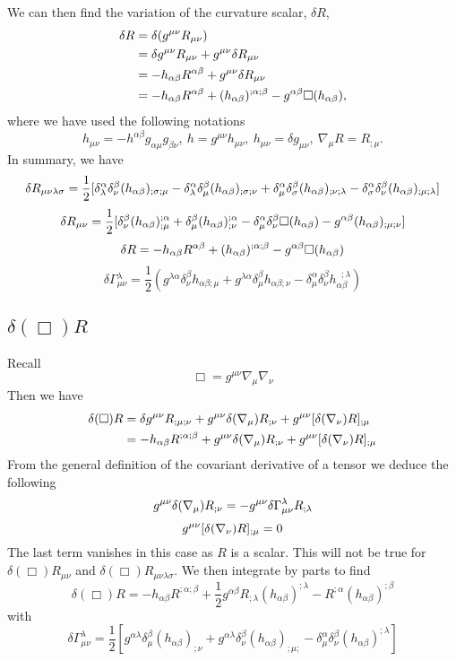 We can then find the variation of the curvature scalar, $\delta R$,
\begin{align}
\delta R&=\delta(g^{\mu\nu}R_{\mu\nu})
\nonumber\\&=\delta g^{\mu\nu}R_{\mu\nu}+g^{\mu\nu}\delta R_{\mu\nu}
\nonumber\\&=-h_{\alpha\beta}R^{\alpha\beta}+g^{\mu\nu}\delta R_{\mu\nu}
\nonumber\\&
=-h_{\alpha\beta}R^{\alpha\beta}+(h_{\alpha\beta})^{;\alpha;\beta}-g^{
\alpha\beta}\square(h_{\alpha\beta})
,\end{align}
where we have used the following notations
\[
h_{\mu\nu}=-h^{\alpha\beta}g_{\alpha\mu}g_{\beta\nu}
,~h=g^{\mu\nu}h_{\mu\nu}
,~h_{\mu\nu}=\delta g_{\mu\nu}
,~\nabla_{\mu}R=R_{;\mu}
.\]
In summary, we have
\[
\delta
R_{\mu\nu\lambda\sigma}=\frac{1}{2}[\delta_{\lambda}^{\alpha}\delta_{\nu}^{\beta
}(h_{\alpha\beta})_{;\sigma;\mu}-\delta_{\lambda}^{\alpha}\delta_{\mu}^{\beta}
(h_{\alpha\beta})_{;\sigma;\nu}+\delta_{\mu}^{\alpha}\delta_{\sigma}^{\beta}(h_{
\alpha\beta})_{;\nu;\lambda}-\delta_{\sigma}^{\alpha}\delta_{\nu}^{\beta}(h_{
\alpha\beta})_{;\mu;\lambda}]
\nonumber\]
\[
\delta
R_{\mu\nu}=\frac{1}{2}[\delta_{\nu}^{\beta}(h_{\alpha\beta})_{;\mu}^{;\alpha}
+\delta_{\mu}^{\beta}(h_{\alpha\beta})_{;\nu}^{;\alpha}-\delta_{\mu}^{\alpha}
\delta_{\nu}^{\beta}\square(h_{\alpha\beta})-g^{\alpha\beta}(h_{\alpha\beta})_{
;\mu;\nu}]
\nonumber\]
\[
\delta
R=-h_{\alpha\beta}R^{\alpha\beta}+(h_{\alpha\beta})^{;\alpha;\beta}-g^{
\alpha\beta}\square(h_{\alpha\beta})
\nonumber\]
\[
\delta\Gamma{}_{\mu\nu}^{\lambda}=\frac{1}{2}(g^{\lambda\alpha}\delta_{\nu}^{
\beta}h_{\alpha\beta;\mu}+g^{\lambda\alpha}\delta_{\mu}^{\beta}h_{
\alpha\beta;\nu}-\delta_{\mu}^{\alpha}\delta_{\nu}^{\beta}h_{\alpha\beta}^{
\;\;;\lambda})
 \]
\subsection{$\delta(\Box)R$}
Recall
\[
\Box=g^{\mu\nu}\nabla_{\mu}\nabla_{\nu}
\]
Then we have
\begin{align}
\nonumber\delta(\Box)R&=\delta
g^{\mu\nu}R_{;\mu;\nu}+g^{\mu\nu}\delta(\nabla_{\mu})R_{;\nu}+g^{\mu\nu}[
\delta(\nabla_{\nu})R]_{;\mu}
\\&
=-h_{\alpha\beta}R^{;\alpha;\beta}+g^{\mu\nu}\delta(\nabla_{\mu})R_{;\nu}+g^{
\mu\nu}[\delta(\nabla_{\nu})R]_{;\mu}
\end{align}
From the general definition of the covariant derivative of a tensor we deduce
the following
\[
 g^{\mu\nu}\delta(\nabla_{\mu})R_{;\nu}=-g^{\mu\nu}\delta\Gamma_{\mu\nu}^{\lambda
}R_{;\lambda}
\]
\[
 g^{\mu\nu}[\delta(\nabla_{\nu})R]_{;\mu}=0
\]
The last term vanishes in this case as $R$ is a scalar. This will not be true
for $\delta(\Box)R_{\mu\nu}$ and $\delta(\Box)R_{\mu\nu\lambda\sigma}$. We then
integrate by parts to find
\[
\delta(\Box)R=-h_{\alpha\beta}R^{;\alpha;\beta}+\frac{1}{2}g^{\alpha\beta}R_{
;\lambda}(h_{\alpha\beta})^{;\lambda}-R^{;\alpha}(h_{\alpha\beta})^{;\beta}
\]
with
\[
\delta\Gamma_{\mu\nu}^{\lambda}=\frac{1}{2}[g^{\alpha\lambda}\delta_{\mu}^{\beta
}(h_{\alpha\beta})_{;\nu}+g^{\alpha\lambda}\delta_{\nu}^{\beta}(h_{\alpha\beta}
)_{;\mu;}-\delta_{\mu}^{\alpha}\delta_{\nu}^{\beta}(h_{\alpha\beta})^{;\lambda}]
\]
